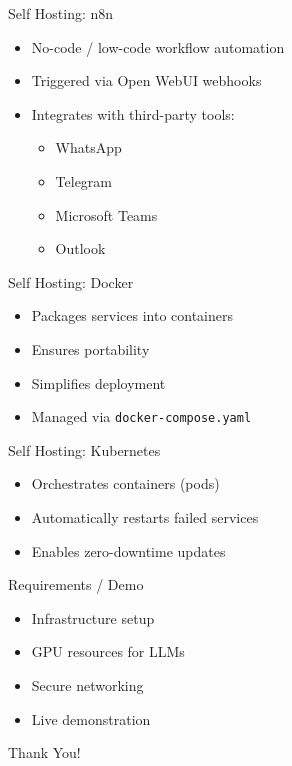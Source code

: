 \documentclass{beamer}
\begin{document}
\begin{frame}{Self Hosting: n8n}
\begin{itemize}
    \item No-code / low-code workflow automation
    \item Triggered via Open WebUI webhooks
    \item Integrates with third-party tools:
    \begin{itemize}
        \item WhatsApp
        \item Telegram
        \item Microsoft Teams
        \item Outlook
    \end{itemize}
\end{itemize}
\end{frame}


\begin{frame}{Self Hosting: Docker}
\begin{itemize}
    \item Packages services into containers
    \item Ensures portability
    \item Simplifies deployment
    \item Managed via \texttt{docker-compose.yaml}
\end{itemize}
\end{frame}


\begin{frame}{Self Hosting: Kubernetes}
\begin{itemize}
    \item Orchestrates containers (pods)
    \item Automatically restarts failed services
    \item Enables zero-downtime updates
\end{itemize}
\end{frame}


\begin{frame}{Requirements / Demo}
\begin{itemize}
    \item Infrastructure setup
    \item GPU resources for LLMs
    \item Secure networking
    \item Live demonstration
\end{itemize}
\end{frame}


\begin{frame}
\centering
\Huge Thank You!
\end{frame}
\end{document}

